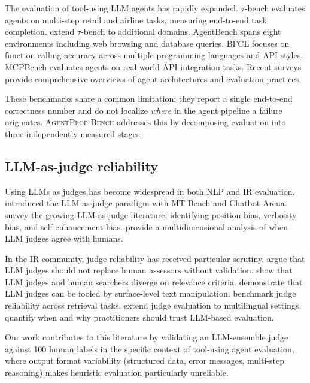\documentclass{article}
\newcommand{\bench}{\textsc{AgentProp-Bench}\xspace}
\begin{document}
The evaluation of tool-using LLM agents has rapidly expanded.
$\tau$-bench \citep{yao2024tau} evaluates agents on multi-step retail
and airline tasks, measuring end-to-end task completion.
\citep{barres2025tau2} extend $\tau$-bench to additional domains.
AgentBench \citep{liu2024agentbench} spans eight environments including
web browsing and database queries.
BFCL \citep{yan2025bfcl} focuses on function-calling accuracy across
multiple programming languages and API styles.
MCPBench \citep{mcpagentbench2026} evaluates agents on real-world API
integration tasks.
Recent surveys \citep{yehudai2025surveyeval,xie2025agentir} provide
comprehensive overviews of agent architectures and evaluation practices.

These benchmarks share a common limitation: they report a single
end-to-end correctness number and do not localize \emph{where} in the
agent pipeline a failure originates.
\bench{} addresses this by decomposing evaluation into three
independently measured stages.

\subsection{LLM-as-judge reliability}

Using LLMs as judges has become widespread in both NLP and IR evaluation.
\citep{zheng2023judging} introduced the LLM-as-judge paradigm with
MT-Bench and Chatbot Arena.
\citep{gu2024surveyjudge} survey the growing LLM-as-judge literature,
identifying position bias, verbosity bias, and self-enhancement bias.
\citep{bavaresco2024llmsjudges} provide a multidimensional analysis of
when LLM judges agree with humans.

In the IR community, judge reliability has received particular scrutiny.
\citep{soboroff2024dont} argue that LLM judges should not replace human
assessors without validation.
\citep{thomas2024searcher} show that LLM judges and human searchers
diverge on relevance criteria.
\citep{alaofi2024fooled} demonstrate that LLM judges can be fooled by
surface-level text manipulation.
\citep{thakur2025judging} benchmark judge reliability across retrieval
tasks.
\citep{fu2025multilingual} extend judge evaluation to multilingual
settings.
\citep{schroeder2024trust} quantify when and why practitioners should
trust LLM-based evaluation.

Our work contributes to this literature by validating an LLM-ensemble
judge against 100 human labels in the specific context of tool-using
agent evaluation, where output format variability (structured data,
error messages, multi-step reasoning) makes heuristic evaluation
particularly unreliable.
\end{document}
